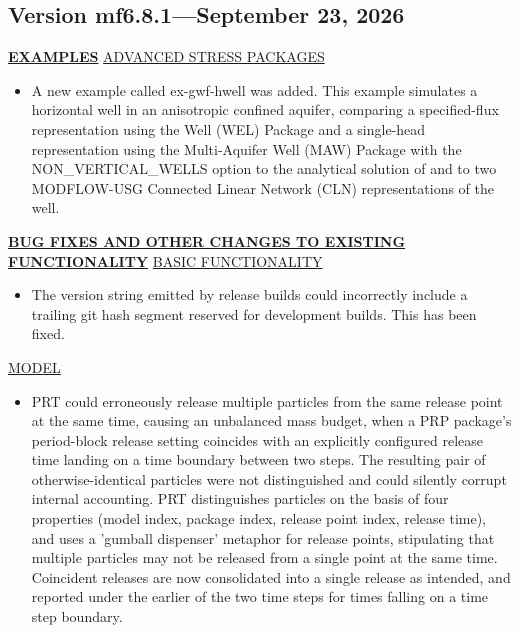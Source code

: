 \subsection{Version mf6.8.1---September 23, 2026}

\textbf{\underline{EXAMPLES}}
\underline{ADVANCED STRESS PACKAGES}
\begin{itemize}
\item A new example called ex-gwf-hwell was added. This example simulates a horizontal well in an anisotropic confined aquifer, comparing a specified-flux representation using the Well (WEL) Package and a single-head representation using the Multi-Aquifer Well (MAW) Package with the NON\_VERTICAL\_WELLS option to the analytical solution of \cite{zhan2001} and to two MODFLOW-USG Connected Linear Network (CLN) representations of the well.
\end{itemize}

\textbf{\underline{BUG FIXES AND OTHER CHANGES TO EXISTING FUNCTIONALITY}}
\underline{BASIC FUNCTIONALITY}
\begin{itemize}
\item The version string emitted by release builds could incorrectly include a trailing git hash segment reserved for development builds. This has been fixed.
\end{itemize}

\underline{MODEL}
\begin{itemize}
\item PRT could erroneously release multiple particles from the same release point at the same time, causing an unbalanced mass budget, when a PRP package's period-block release setting coincides with an explicitly configured release time landing on a time boundary between two steps. The resulting pair of otherwise-identical particles were not distinguished and could silently corrupt internal accounting. PRT distinguishes particles on the basis of four properties (model index, package index, release point index, release time), and uses a 'gumball dispenser' metaphor for release points, stipulating that multiple particles may not be released from a single point at the same time. Coincident releases are now consolidated into a single release as intended, and reported under the earlier of the two time steps for times falling on a time step boundary.
\end{itemize}
